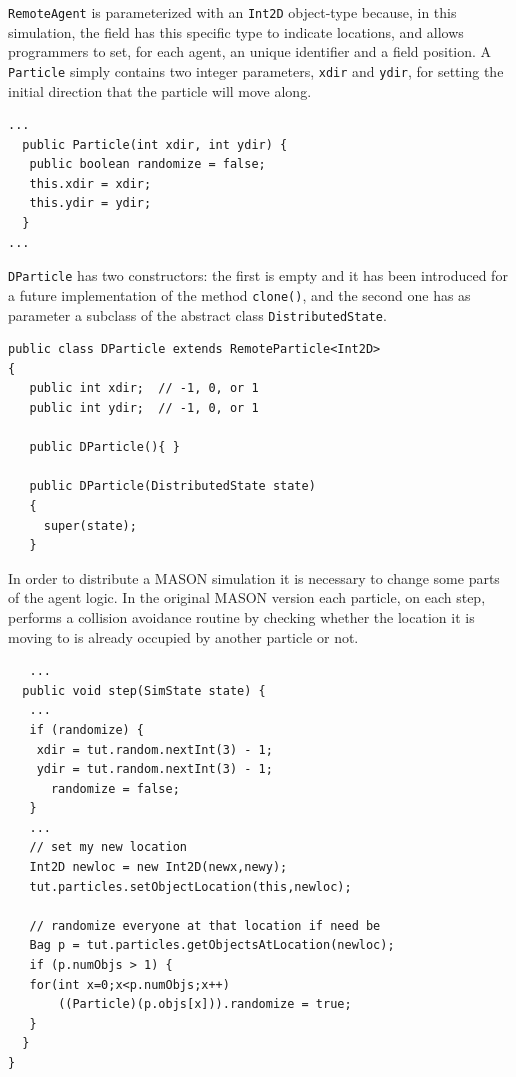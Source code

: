 \documentclass{article}
\begin{document}
\texttt{RemoteAgent} is parameterized with an \texttt{Int2D} object-type because, in this simulation, the field has this specific type to indicate locations, and allows programmers to set, for each agent, an unique identifier and a field position.
A \texttt{Particle} simply contains two integer parameters, \texttt{xdir} and \texttt{ydir}, for setting the initial direction that the particle will move along.

\begin{lstlisting}
...
  public Particle(int xdir, int ydir) {
   public boolean randomize = false;
   this.xdir = xdir;
   this.ydir = ydir;
  }
...
\end{lstlisting}


\texttt{DParticle} has two constructors: the first is empty and it has been introduced for a future implementation of the method \texttt{clone()}, and the second one has as parameter a subclass of the abstract class \texttt{DistributedState}.

\begin{lstlisting}
public class DParticle extends RemoteParticle<Int2D>
{
   public int xdir;  // -1, 0, or 1
   public int ydir;  // -1, 0, or 1

   public DParticle(){ }
   
   public DParticle(DistributedState state)
   {
     super(state);
   }
\end{lstlisting}

In order to distribute a MASON simulation it is necessary to change some parts of the agent logic. In the original MASON version each particle, on each step, performs a collision avoidance routine by checking whether the location it is moving to is already occupied by another particle or not. 

\begin{lstlisting}
   ...
  public void step(SimState state) {
   ...
   if (randomize) {
    xdir = tut.random.nextInt(3) - 1;
    ydir = tut.random.nextInt(3) - 1;
	  randomize = false;
   }
   ...
   // set my new location
   Int2D newloc = new Int2D(newx,newy);
   tut.particles.setObjectLocation(this,newloc);
   
   // randomize everyone at that location if need be
   Bag p = tut.particles.getObjectsAtLocation(newloc);
   if (p.numObjs > 1) {
   for(int x=0;x<p.numObjs;x++)
       ((Particle)(p.objs[x])).randomize = true;
   }
  }
}
\end{lstlisting}
\end{document}
